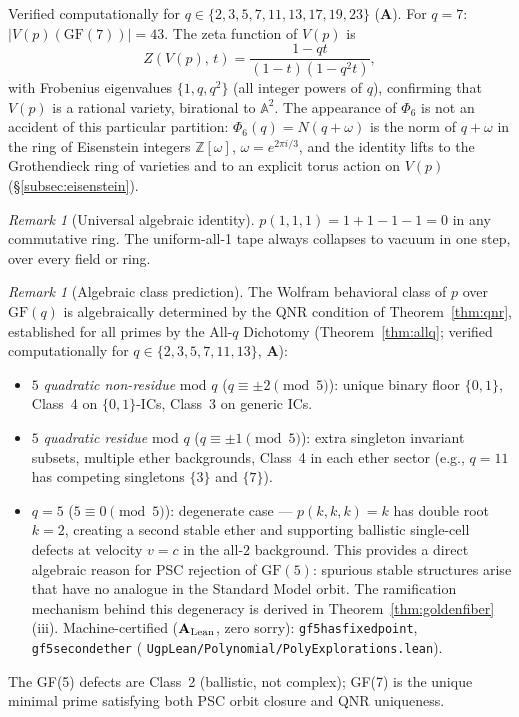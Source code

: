 \documentclass[11pt]{article}
\theoremstyle{remark}
\newtheorem{remark}[theorem]{Remark}
\newcommand{\GF}[1]{\ensuremath{\mathrm{GF}(#1)}}
\newcommand{\lean}[1]{%
  \penalty-100
  \begingroup\def\_{\textunderscore\allowbreak}\texttt{#1}\endgroup}
\newcommand{\CatA}{\textbf{A}}
\newcommand{\CatAL}{\texorpdfstring{\ensuremath{\textbf{A}_{\rm Lean}}}{A-Lean}}
\begin{document}
\noindent Verified computationally for $q\in\{2,3,5,7,11,13,17,19,23\}$ (\CatA{}).
For $q = 7$: $|V(p)(\GF{7})| = 43$.
The zeta function of $V(p)$ is
\[
  Z(V(p),\,t) = \frac{1-qt}{(1-t)(1-q^2 t)},
\]
with Frobenius eigenvalues $\{1, q, q^2\}$ (all integer powers of $q$),
confirming that $V(p)$ is a rational variety, birational to $\mathbb{A}^2$.
The appearance of $\Phi_6$ is not an accident of this particular partition:
$\Phi_6(q) = N(q + \omega)$ is the norm of $q + \omega$ in the ring of
Eisenstein integers $\mathbb{Z}[\omega]$, $\omega = e^{2\pi i/3}$, and the
identity lifts to the Grothendieck ring of varieties and to an explicit
torus action on $V(p)$ (§\ref{subsec:eisenstein}).

\begin{remark}[Universal algebraic identity]
\label{rem:p111}
$p(1,1,1) = 1+1-1-1 = 0$ in any commutative ring. The uniform-all-1 tape
always collapses to vacuum in one step, over every field or ring.
\end{remark}

\begin{remark}[Algebraic class prediction]
\label{rem:classpred}
The Wolfram behavioral class of $p$ over $\GF{q}$ is algebraically determined
by the QNR condition of Theorem~\ref{thm:qnr}, established for all primes by
the All-$q$ Dichotomy (Theorem~\ref{thm:allq}; verified computationally for
$q\in\{2,3,5,7,11,13\}$, \CatA{}):
\begin{itemize}[leftmargin=2em,itemsep=2pt]
  \item $5$ \emph{quadratic non-residue} mod $q$ ($q\equiv\pm 2\pmod5$):
    unique binary floor $\{0,1\}$, Class~4 on $\{0,1\}$-ICs, Class~3 on generic ICs.
  \item $5$ \emph{quadratic residue} mod $q$ ($q\equiv\pm 1\pmod5$):
    extra singleton invariant subsets, multiple ether backgrounds, Class~4 in
    each ether sector (e.g., $q=11$ has competing singletons $\{3\}$ and $\{7\}$).
  \item $q = 5$ ($5\equiv 0\pmod5$): degenerate case --- $p(k,k,k)=k$ has
    double root $k=2$, creating a second stable ether and supporting
    ballistic single-cell defects at velocity $v = c$ in the all-$2$ background.
    This provides a direct algebraic reason for PSC rejection of $\GF{5}$:
    spurious stable structures arise that have no analogue in the Standard Model orbit.
    The ramification mechanism behind this degeneracy is derived in
    Theorem~\ref{thm:goldenfiber}(iii).
    Machine-certified (\CatAL{}, zero sorry):
    \lean{gf5\_has\_fixed\_point}, \lean{gf5\_second\_ether}
    (\lean{UgpLean/Polynomial/PolyExplorations.lean}).
\end{itemize}
The GF(5) defects are Class~2 (ballistic, not complex); GF(7) is the unique
minimal prime satisfying both PSC orbit closure and QNR uniqueness.
\end{remark}
\end{document}
